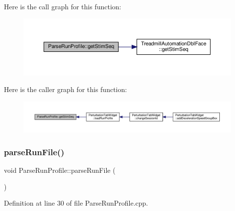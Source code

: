 Here is the call graph for this function\+:
\nopagebreak
\begin{figure}[H]
\begin{center}
\leavevmode
\includegraphics[width=350pt]{class_parse_run_profile_a4778a2e2bc77c46a0686c548d218739b_cgraph}
\end{center}
\end{figure}
Here is the caller graph for this function\+:
\nopagebreak
\begin{figure}[H]
\begin{center}
\leavevmode
\includegraphics[width=350pt]{class_parse_run_profile_a4778a2e2bc77c46a0686c548d218739b_icgraph}
\end{center}
\end{figure}
\mbox{\label{class_parse_run_profile_a4d7cec4c1bf3b5f2ca41edabb098ac45}} 
\subsubsection{\texorpdfstring{parse\+Run\+File()}{parseRunFile()}}
{\footnotesize\ttfamily void Parse\+Run\+Profile\+::parse\+Run\+File (\begin{DoxyParamCaption}{ }\end{DoxyParamCaption})}



Definition at line 30 of file Parse\+Run\+Profile.\+cpp.

